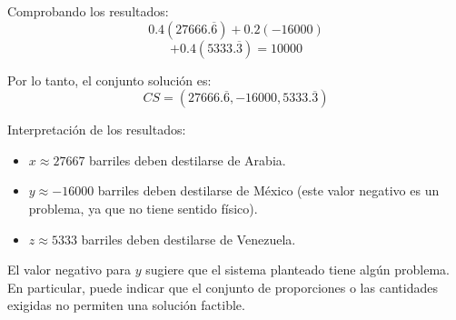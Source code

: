 \documentclass[12pt,a4paper]{article}
\begin{document}
\begin{enumerate}
\begin{enumerate}
\begin{multicols}{2}
        Comprobando los resultados:
        \[
        0.4(27666.\overline{6}) + 0.2(-16000) 
        \]
        \[
        + 0.4(5333.\overline{3}) = 10000
        \]
        

        Por lo tanto, el conjunto solución es:
        \[
        CS = (27666.\overline{6}, -16000, 5333.\overline{3})
        \]
        \end{multicols}
        
        Interpretación de los resultados:
        \begin{itemize}
            \item \(x \approx 27667\) barriles deben destilarse de Arabia.
            \item \(y \approx -16000\) barriles deben destilarse de México (este valor negativo es un problema, ya que no tiene sentido físico).
            \item \(z \approx 5333\) barriles deben destilarse de Venezuela.
        \end{itemize}
        
        El valor negativo para \(y\) sugiere que el sistema planteado tiene algún problema. En particular, puede indicar que el conjunto de proporciones o las cantidades exigidas no permiten una solución factible.
    \end{enumerate}
\end{enumerate}
\end{document}
